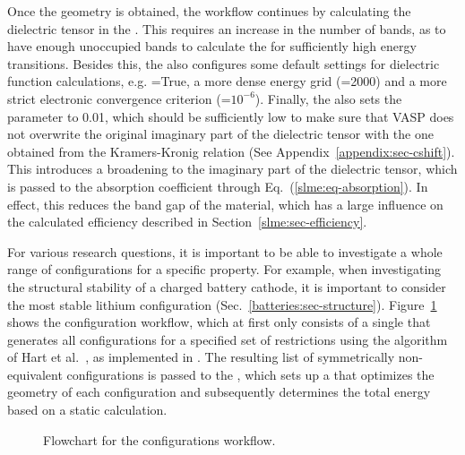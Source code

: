 \begin{refsection}
Once the geometry is obtained, the workflow continues by calculating the 
dielectric tensor in the . This requires an increase in the 
number of bands, as to have enough unoccupied bands to calculate the 
 for sufficiently high energy 
transitions. Besides this, the  also configures some default 
settings for dielectric function calculations, e.g. =True, a 
more dense energy grid (=2000) and a more strict electronic 
convergence criterion (=$10^{-6}$). Finally, the  
also sets the  parameter to 0.01, which should be sufficiently low to make sure 
that VASP does not overwrite the original imaginary part of the 
dielectric tensor with the one obtained from the Kramers-Kronig relation (See Appendix~\ref{appendix:sec-cshift}). This 
introduces a broadening to the imaginary part of the dielectric tensor, which 
is passed to the absorption coefficient through 
Eq.~(\ref{slme:eq-absorption}). In effect, this reduces the band gap of the 
material, which has a large influence on the calculated efficiency described 
in Section~\ref{slme:sec-efficiency}. 
 
 
For various research questions, it is important to be able to investigate a 
whole range of configurations for a specific property. For example, when 
investigating the structural stability of a charged battery cathode, it is 
important to consider the most stable lithium 
configuration (Sec.~\ref{batteries:sec-structure}). 
Figure~\ref{automation:fig-configurations} shows the configuration workflow, 
which at first only consists of a single  that generates all 
configurations for a specified set of restrictions using the algorithm of Hart 
et al.~\cite{Hart2005}, as implemented in 
. The 
resulting list of symmetrically non-equivalent configurations is passed to the 
, which sets up a 
 that optimizes the geometry of each configuration and 
subsequently determines the total energy based on a static calculation. 
 
\begin{figure}[ht] 
\centering 
 
\caption{\label{automation:fig-configurations} Flowchart for the 
configurations workflow.} 
\end{figure} 
 

\end{refsection}
